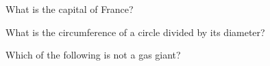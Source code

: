 \documentclass[answers]{exam}
\begin{document}
\begin{questions}
\question
What is the capital of France?
\begin{oneparchoices}
\end{oneparchoices}

\question
What is the circumference of a circle divided by its diameter?
\begin{choices}
\end{choices}

\question
Which of the following is not a gas giant?
\begin{choices}
\end{choices}
\end{questions}
\end{document}
